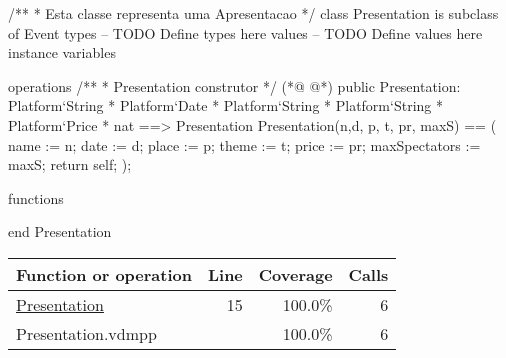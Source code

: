\begin{vdmpp}[breaklines=true]
/**
* Esta classe representa uma Apresentacao
*/
class Presentation is subclass of Event
types
-- TODO Define types here
values
-- TODO Define values here
instance variables
 
operations
 /**
 * Presentation construtor
 */
(*@
\label{Presentation:15}
@*)
 public Presentation: Platform`String * Platform`Date * Platform`String *  Platform`String * Platform`Price * nat ==> Presentation 
  Presentation(n,d, p, t, pr,  maxS) == 
  (
   name := n;
   date := d;
   place := p;
   theme := t;
   price := pr;
   maxSpectators := maxS;
   return self;
  );
  
functions

end Presentation
\end{vdmpp}
\bigskip
\begin{longtable}{|l|r|r|r|}
\hline
Function or operation & Line & Coverage & Calls \\
\hline
\hline
\hyperref[Presentation:15]{Presentation} & 15&100.0\% & 6 \\
\hline
\hline
Presentation.vdmpp & & 100.0\% & 6 \\
\hline
\end{longtable}

